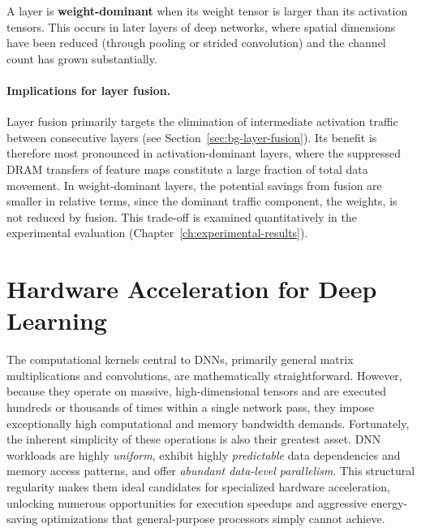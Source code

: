 A layer is \textbf{weight-dominant} when its weight tensor is
larger than its activation tensors.
This occurs in later layers of deep networks, where spatial dimensions
have been reduced (through pooling or strided convolution) and the
channel count has grown substantially.

\paragraph{Implications for layer fusion.}
Layer fusion primarily targets the elimination of intermediate
activation traffic between consecutive layers
(see Section~\ref{sec:bg-layer-fusion}).
Its benefit is therefore most pronounced in activation-dominant layers,
where the suppressed DRAM transfers of feature maps constitute a large
fraction of total data movement.
In weight-dominant layers, the potential savings from fusion are smaller
in relative terms, since the dominant traffic component, the
weights, is not reduced by fusion.
This trade-off is examined quantitatively in the experimental
evaluation (Chapter~\ref{ch:experimental-results}).


\section{Hardware Acceleration for Deep Learning}
\label{sec:bg-hw-accel}

The computational kernels central to DNNs, primarily general matrix multiplications and convolutions, are mathematically straightforward. However, because they operate on massive, high-dimensional tensors and are executed hundreds or thousands of times within a single network pass, they impose exceptionally high computational and memory bandwidth demands. Fortunately, the inherent simplicity of these operations is also their greatest asset. DNN workloads are highly \emph{uniform}, exhibit highly \emph{predictable} data dependencies and memory access patterns, and offer \emph{abundant data-level parallelism}.  This structural regularity makes them ideal candidates for specialized hardware acceleration, unlocking numerous opportunities for execution speedups and aggressive energy-saving optimizations that general-purpose processors simply cannot achieve.



